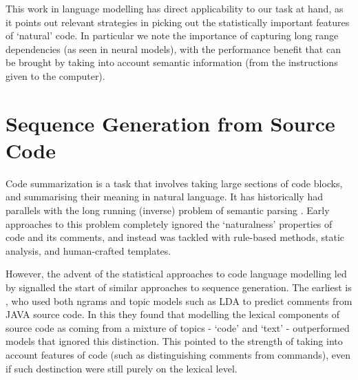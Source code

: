 This work in language modelling has direct applicability to our task at hand, as it points out relevant strategies in picking out the statistically important features of `natural' code. In particular we note the importance of capturing long range dependencies (as seen in neural models), with the performance benefit that can be brought by taking into account semantic information (from the instructions given to the computer).

\section{Sequence Generation from Source Code}

Code summarization is a task that involves taking large sections of code blocks, and summarising their meaning in natural language. It has historically had parallels with the long running (inverse) problem of semantic parsing \citep{allamanis_survey_2017,zhong_seq2sql_2017}.
Early approaches to this problem completely ignored the `naturalness' properties of code and its comments, and instead was tackled with rule-based methods, static analysis, and human-crafted templates. \citep{sridhara_[not_2010}


However, the advent of the statistical approaches to code language modelling led by \citet{Hindle:2012:NS:2337223.2337322} signalled the start of similar approaches to sequence generation. The earliest is \citet{movshovitz-attias_natural_nodate}, who used both ngrams and topic models such as LDA \citep{blei_latent_2003} to predict comments from JAVA source code. In this they found that modelling the lexical components of source code as coming from a mixture of topics - `code' and `text' - outperformed models that ignored this distinction.  This pointed to the strength of taking into account features of code (such as distinguishing comments from commands), even if such destinction were still purely on the lexical level.

